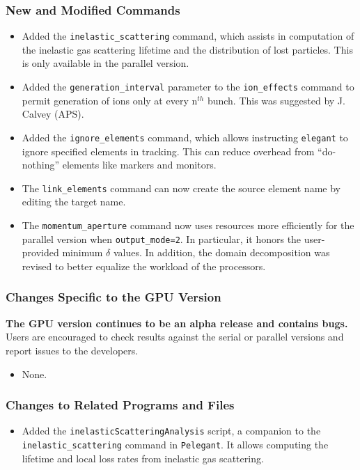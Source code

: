 \documentclass[11pt]{article}
\begin{document}
\subsubsection{New and Modified Commands}
\begin{itemize}
\item Added the \verb|inelastic_scattering| command, which assists in computation of the inelastic gas scattering
  lifetime and the distribution of lost particles. This is only available in the parallel version.
\item Added the \verb|generation_interval| parameter to the \verb|ion_effects| command to permit generation of
  ions only at every n$^{th}$ bunch. This was suggested by J. Calvey (APS).
\item Added the \verb|ignore_elements| command, which allows instructing \verb|elegant| to ignore specified elements
  in tracking. This can reduce overhead from ``do-nothing'' elements like markers and monitors.
\item The \verb|link_elements| command can now create the source element name by editing the target name.
\item The \verb|momentum_aperture| command now uses resources more efficiently for the parallel version when 
  \verb|output_mode=2|. In particular, it honors the user-provided minimum $\delta$ values.
  In addition, the domain decomposition was revised to better equalize the workload of the processors.
\end{itemize}

\subsubsection{Changes Specific to the GPU Version}

{\bf The GPU version continues to be an alpha release and contains bugs.}
Users are encouraged to check results against the serial or parallel versions and report issues to the developers.

\begin{itemize}
\item None.
\end{itemize}

\subsubsection{Changes to Related Programs and Files}

\begin{itemize}
\item Added the \verb|inelasticScatteringAnalysis| script, a companion to the \verb|inelastic_scattering| command in
  \verb|Pelegant|. It allows computing the lifetime and local loss rates from inelastic gas scattering.
\end{itemize}
\end{document}
